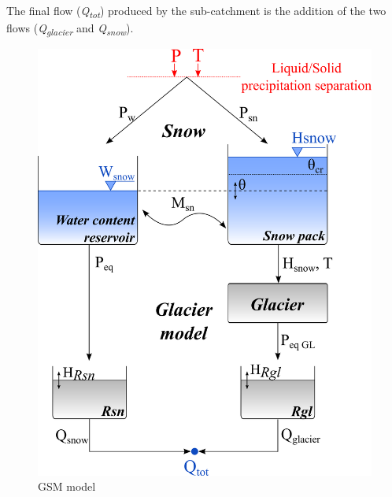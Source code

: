\documentclass[
  letterpaper,
  DIV=11,
  numbers=noendperiod]{scrreprt}
\begin{document}
The final flow (\emph{Q\textsubscript{tot}}) produced by the
sub-catchment is the addition of the two flows
(\emph{Q\textsubscript{glacier}} and \emph{Q\textsubscript{snow}}).

\begin{figure}

{\centering \includegraphics{./figures/fig-model_gsm.png}

}

\caption{\label{fig-model_gsm}GSM model}

\end{figure}
\end{document}
